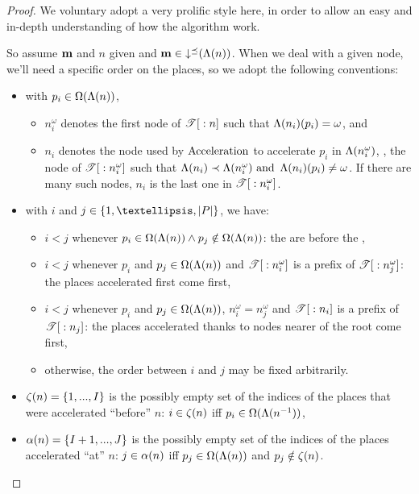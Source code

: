 \begin{proof}
  We voluntary adopt a very prolific style here, in order to allow an easy and in-depth understanding of how the algorithm work.

  So assume $\mathbf{m}$ and $n$ given and $\mathbf{m} \in \operatorname{\downarrow^\preceq}(\operatorname{\Lambda}(n))$.
  When we deal with a given node, we'll need a specific order on the places, so we adopt the following conventions:
  \begin{itemize}
    \item with $p_i \in \operatorname{\Omega}(\operatorname{\Lambda}(n))$,
      \begin{itemize}
        \item $n^\omega_i$ denotes the first node of ${\mathscr{T}}[{}:{n}]$ such that $\operatorname{\Lambda}(n_i)(p_i) = \omega$, and
        \item $n_i$ denotes the node used by $\operatorname{Acceleration}$ to accelerate $p_i$ in $\operatorname{\Lambda}(n^\omega_i)$, \ie, the node of ${\mathscr{T}}[{}:{n^\omega_i}]$ such that $\operatorname{\Lambda}(n_i) \prec \operatorname{\Lambda}(n^\omega_i) \text{ and } \operatorname{\Lambda}(n_i)(p_i) \neq \omega$.
          If there are many such nodes, $n_i$ is the last one in ${\mathscr{T}}[{}:{n^\omega_i}]$.
      \end{itemize}
    \item with $i$ and $j \in \{1, …, \card{\places}\}$, we have:
      \begin{itemize}
        \item $i < j$ whenever $p_i \in \operatorname{\Omega}(\operatorname{\Lambda}(n)) \wedge p_j \notin \operatorname{\Omega}(\operatorname{\Lambda}(n))$:
          the \oplaces are before the \noplaces,
        \item $i < j$ whenever $p_i$ and $p_j \in \operatorname{\Omega}(\operatorname{\Lambda}(n))$ and ${\mathscr{T}}[{}:{n^\omega_i}]$ is a prefix of ${\mathscr{T}}[{}:{n^\omega_j}]$:
          the places accelerated first come first,
        \item $i < j$ whenever $p_i$ and $p_j \in \operatorname{\Omega}(\operatorname{\Lambda}(n))$, $n^\omega_i = n^\omega_j$ and ${\mathscr{T}}[{}:{n_i}]$ is a prefix of ${\mathscr{T}}[{}:{n_j}]$:
          the places accelerated thanks to nodes nearer of the root come first,
        \item otherwise, the order between $i$ and $j$ may be fixed arbitrarily.
      \end{itemize}
    \item $\operatorname{\zeta}(n) = \{1, ..., I\}$ is the possibly empty set of the indices of the places that were accelerated ``before'' $n$: $i \in \operatorname{\zeta}(n)$ iff $p_i \in \operatorname{\Omega}(\operatorname{\Lambda}(n^{-1}))$,
    \item $\operatorname{\alpha}(n) = \{I+1, ..., J\}$ is the possibly empty set of the indices of the places accelerated ``at'' $n$: $j \in \operatorname{\alpha}(n)$ iff $p_j \in \operatorname{\Omega}(\operatorname{\Lambda}(n))$ and $p_j \notin \operatorname{\zeta}(n)$.%
  \end{itemize}


\end{proof}
